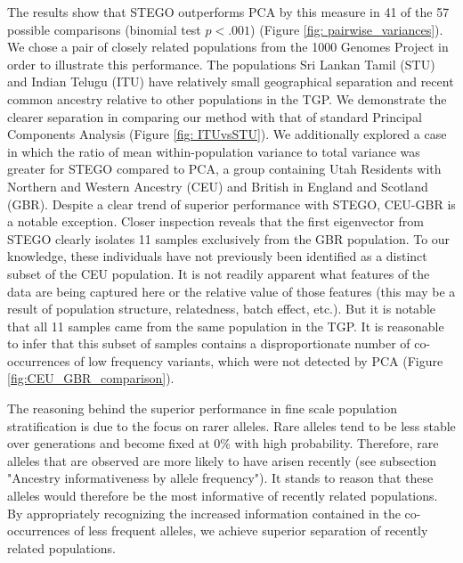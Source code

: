 The results show that STEGO outperforms PCA by this measure in 41
of the 57 possible comparisons (binomial test $p<.001$) (Figure \ref{fig: pairwise_variances}). We chose a pair of closely related populations from the
1000 Genomes Project in order to illustrate this performance. The
populations Sri Lankan Tamil (STU) and Indian Telugu (ITU) have relatively
small geographical separation and recent common ancestry relative
to other populations in the TGP. We demonstrate the clearer separation in comparing our method with that of standard Principal Components Analysis (Figure \ref{fig: ITUvsSTU}).  We additionally explored a case in which the ratio of mean within-population variance
to total variance was greater for STEGO compared to PCA, a group containing Utah Residents with Northern and Western Ancestry (CEU) and British in England and Scotland (GBR).  Despite a clear trend of superior performance with STEGO, CEU-GBR is a notable exception. Closer inspection reveals that the first eigenvector from STEGO clearly isolates 11 samples exclusively from the GBR population. To our knowledge, these individuals have not previously been identified as a distinct subset of the CEU population. It is not readily apparent what features of the data are being captured here or the relative value of those features (this may be a result of population structure, relatedness, batch effect, etc.). But it is notable that all 11 samples came from the same population in the TGP. It is reasonable to infer that this subset of samples contains a disproportionate number of co-occurrences of low frequency variants, which were not detected by PCA (Figure \ref{fig:CEU_GBR_comparison}).

The reasoning behind the superior performance in fine scale population
stratification is due to the focus on rarer alleles. Rare alleles
tend to be less stable over generations and become fixed at 0\% with
high probability. Therefore, rare alleles that are observed are more
likely to have arisen recently (see subsection "Ancestry informativeness by allele frequency"). It stands to reason that these alleles
would therefore be the most informative of recently related populations.
By appropriately recognizing the increased information contained in
the co-occurrences of less frequent alleles, we achieve superior separation
of recently related populations.

